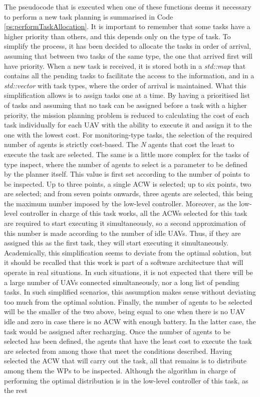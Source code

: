 \documentclass[fontsize=11pt, English=false, Español=true, Myfinal=true, twoside, numbers=noenddot]{scrbook}
\begin{document}
The pseudocode that is executed when one of these functions deems it necessary to perform a new task planning is summarised in Code \ref{ps:performTaskAllocation}. It is important to remember that some tasks have a higher priority than others, and this depends only on the type of task. To simplify the process, it has been decided to allocate the tasks in order of arrival, assuming that between two tasks of the same type, the one that arrived first will have priority. When a new task is received, it is stored both in a \emph{std::map} that contains all the pending tasks to facilitate the access to the information, and in a \emph{std::vector} with task types, where the order of arrival is maintained. What this simplification allows is to assign tasks one at a time. By having a prioritised list of tasks and assuming that no task can be assigned before a task with a higher priority, the mission planning problem is reduced to calculating the cost of each task individually for each \gls{UAV} with the ability to execute it and assign it to the one with the lowest cost. For monitoring-type tasks, the selection of the required number of agents is strictly cost-based. The \emph{N} agents that cost the least to execute the task are selected. The same is a little more complex for the tasks of type inspect, where the number of agents to select is a parameter to be defined by the planner itself. This value is first set according to the number of points to be inspected. Up to three points, a single \gls{ACW} is selected; up to six points, two are selected; and from seven points onwards, three agents are selected, this being the maximum number imposed by the low-level controller. Moreover, as the low-level controller in charge of this task works, all the \glspl{ACW} selected for this task are required to start executing it simultaneously, so a second approximation of this number is made according to the number of idle \glspl{UAV}. Thus, if they are assigned this as the first task, they will start executing it simultaneously. Academically, this simplification seems to deviate from the optimal solution, but it should be recalled that this work is part of a software architecture that will operate in real situations. In such situations, it is not expected that there will be a large number of \glspl{UAV} connected simultaneously, nor a long list of pending tasks. In such simplified scenarios, this assumption makes sense without deviating too much from the optimal solution. Finally, the number of agents to be selected will be the smaller of the two above, being equal to one when there is no \gls{UAV} idle and zero in case there is no \gls{ACW} with enough battery. In the latter case, the task would be assigned after recharging. Once the number of agents to be selected has been defined, the agents that have the least cost to execute the task are selected from among those that meet the conditions described. Having selected the \gls{ACW} that will carry out the task, all that remains is to distribute among them the \glspl{WP} to be inspected. Although the algorithm in charge of performing the optimal distribution is in the low-level controller of this task, as the rest 
\end{document}
